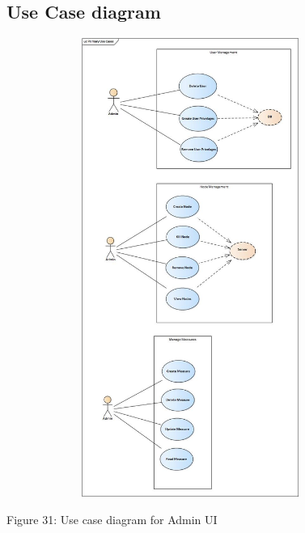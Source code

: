 \subsection{Use Case diagram}
    \includegraphics[width=12cm,height=15cm,keepaspectratio]{admin_ui/images/Primary_Use_Cases.png}
    \begin{center}
    	\small{Figure 31: Use case diagram for Admin UI}
    \end{center}